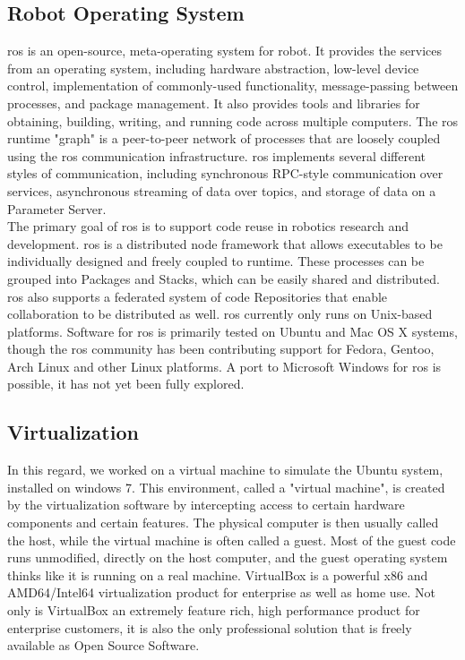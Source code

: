 \subsection{Robot Operating System}
\label{subsec:ros}

\gls{ros} is an open-source, meta-operating system for robot. It provides the services from an operating system, including hardware abstraction, low-level device control, implementation of commonly-used functionality, message-passing between processes, and package management. It also provides tools and libraries for obtaining, building, writing, and running code across multiple computers. The \gls{ros} runtime "graph" is a peer-to-peer network of processes that are loosely coupled using the \gls{ros} communication infrastructure. \gls{ros} implements several different styles of communication, including synchronous RPC-style communication over services, asynchronous streaming of data over topics, and storage of data on a Parameter Server. \\

\noindent The primary goal of \gls{ros} is to support code reuse in robotics research and development. \gls{ros} is a distributed node framework that allows executables to be individually designed and freely coupled to runtime. These processes can be grouped into Packages and Stacks, which can be easily shared and distributed. \gls{ros} also supports a federated system of code Repositories that enable collaboration to be distributed as well. \gls{ros} currently only runs on Unix-based platforms. Software for \gls{ros} is primarily tested on Ubuntu and Mac OS X systems, though the \gls{ros} community has been contributing support for Fedora, Gentoo, Arch Linux and other Linux platforms. A port to Microsoft Windows for \gls{ros} is possible, it has not yet been fully explored. \\

\subsection{Virtualization}
\label{subsec:virtual}
\noindent In this regard, we worked on a virtual machine to simulate the Ubuntu system, installed on windows 7. This environment, called a "virtual machine", is created by the virtualization software by intercepting access to certain hardware components and certain features. The physical computer is then usually called the host, while the virtual machine is often called a guest. Most of the guest code runs unmodified, directly on the host computer, and the guest operating system thinks like it is running on a real machine. VirtualBox is a powerful x86 and AMD64/Intel64 virtualization product for enterprise as well as home use. Not only is VirtualBox an extremely feature rich, high performance product for enterprise customers, it is also the only professional solution that is freely available as Open Source Software. \\

